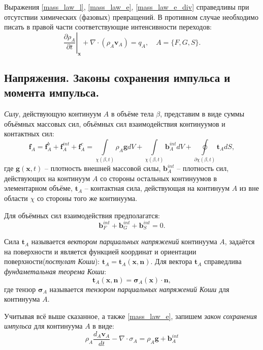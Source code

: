 	Выражения \eqref{mass_law_l}, \eqref{mass_law_e}, \eqref{mass_law_e_div} справедливы при отсутствии химических (фазовых) превращений. В противном случае необходимо писать в правой части соответствующие интенсивности переходов:
\begin{equation}
	\label{mass_law_e_div}
	\left.\frac{\partial \rho_A}{\partial t}\right|_{\mathbf{x}} + \nabla \cdot \left(\rho_A \mathbf{v}_A\right) = q_A, \quad A=\{F, G, S\}.
\end{equation}

\subsection{Напряжения. Законы сохранения импульса и момента импульса.}
	\textit{Силу}, действующую континуум $A$ в объёме тела $\beta$, представим в виде суммы объёмных массовых сил, объёмных сил взаимодействия континуумов и контактных сил:
\begin{equation}
	\label{force_A}
	\mathbf{f}_A = \mathbf{f}_A^b + \mathbf{f}_A^{int} + \mathbf{f}_A^c = \int\limits_{\chi({\beta}, t)}\rho_A \mathbf{g} dV + \int\limits_{\chi({\beta}, t)}\mathbf{b}_A^{int} dV + \oint\limits_{\partial\chi({\beta}, t)}\mathbf{t}_A dS,
\end{equation}
	где $\mathbf{g}(\mathbf{x}, t)$ -- плотность внешней массовой силы,
	$\mathbf{b}_A^{int}$ -- плотность сил, действующих на континуум $A$ со стороны остальных континуумов в элементарном объёме,
	$\mathbf{t}_A$ -- контактная сила, действующая на континуум $A$ из вне области $\chi$ со стороны того же континуума.

	Для объёмных сил взаимодействия предполагатся:
\begin{equation}
	\label{force_int}
	\mathbf{b}_F^{int} + \mathbf{b}_G^{int} + \mathbf{b}_S^{int} = 0.
\end{equation}
	
	Сила $\mathbf{t}_A$ называется \textit{вектором парциальных напряжений} континуума $A$, задаётся на поверхности и является функцией координат и ориентации поверхности(\textit{постулат Коши}): $\mathbf{t}_A = \mathbf{t}_A(\mathbf{x}, \mathbf{n})$. Для вектора $\mathbf{t}_A$ справедлива \textit{фундаметальная теорема Коши}:
\begin{equation}
	\label{coushy_th}
	\mathbf{t}_A(\mathbf{x}, \mathbf{n}) = \mathbf{\sigma}_A(\mathbf{x}) \cdot \mathbf{n}, 
\end{equation}
	где тензор $\mathbf{\sigma}_A$ называется \textit{тензором парциальных напряжений Коши} для континуума $A$.

	Учитывая всё выше сказанное, а также \eqref{mass_law_e}, запишем \textit{закон сохранения импульса} для континуума $A$ в виде:
\begin{equation}
	\label{momentum_law}
	\rho_A\frac{d_A\mathbf{v}_A}{dt} - \nabla \cdot \sigma_A = \rho_A\mathbf{g} + \mathbf{b}_A^{int}
\end{equation}

